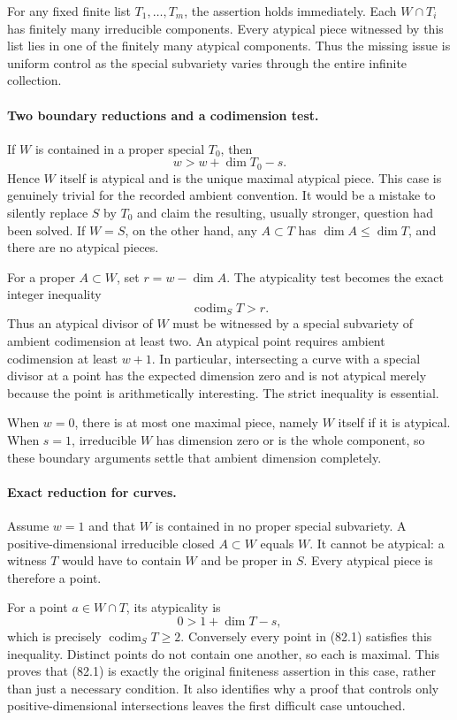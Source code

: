 \documentclass[11pt]{article}
\begin{document}
For any fixed finite list $T_1,\ldots,T_m$, the assertion holds immediately. Each $W\cap T_i$ has finitely many irreducible components. Every atypical piece witnessed by this list lies in one of the finitely many atypical components. Thus the missing issue is uniform control as the special subvariety varies through the entire infinite collection.

\paragraph{Two boundary reductions and a codimension test.}
If $W$ is contained in a proper special $T_0$, then
\[
 w>w+\dim T_0-s.
\]
Hence $W$ itself is atypical and is the unique maximal atypical piece. This case is genuinely trivial for the recorded ambient convention. It would be a mistake to silently replace $S$ by $T_0$ and claim the resulting, usually stronger, question had been solved. If $W=S$, on the other hand, any $A\subset T$ has $\dim A\le\dim T$, and there are no atypical pieces.

For a proper $A\subset W$, set $r=w-\dim A$. The atypicality test becomes the exact integer inequality
\[
 \operatorname{codim}_S T>r.
 \tag{82.2}
\]
Thus an atypical divisor of $W$ must be witnessed by a special subvariety of ambient codimension at least two. An atypical point requires ambient codimension at least $w+1$. In particular, intersecting a curve with a special divisor at a point has the expected dimension zero and is not atypical merely because the point is arithmetically interesting. The strict inequality is essential.

When $w=0$, there is at most one maximal piece, namely $W$ itself if it is atypical. When $s=1$, irreducible $W$ has dimension zero or is the whole component, so these boundary arguments settle that ambient dimension completely.

\paragraph{Exact reduction for curves.}
Assume $w=1$ and that $W$ is contained in no proper special subvariety. A positive-dimensional irreducible closed $A\subset W$ equals $W$. It cannot be atypical: a witness $T$ would have to contain $W$ and be proper in $S$. Every atypical piece is therefore a point.

For a point $a\in W\cap T$, its atypicality is
\[
 0>1+\dim T-s,
\]
which is precisely $\operatorname{codim}_S T\ge2$. Conversely every point in (82.1) satisfies this inequality. Distinct points do not contain one another, so each is maximal. This proves that (82.1) is exactly the original finiteness assertion in this case, rather than just a necessary condition. It also identifies why a proof that controls only positive-dimensional intersections leaves the first difficult case untouched.
\end{document}

